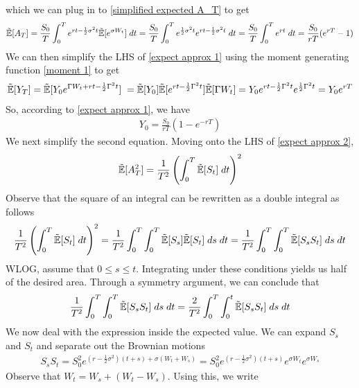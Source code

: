 \documentclass[reqno]{amsart}
\newcommand{\rE}[1]{\tilde{\E}[#1]}
\begin{document}
which we can plug in to \eqref{simplified expected A_T} to get
\begin{align} 
     \rE{A_T}
     = \frac{S_0}{T} \int_0^T e^{rt-\frac{1}{2}\sigma^2t} \rE{e^{\sigma W_t}}  \; dt
     = \frac{S_0}{T} \int_0^T e^{\frac{1}{2}\sigma^2 t} e^{rt-\frac{1}{2}\sigma^2t} \; dt
     = \frac{S_0}{T} \int_0^T e^{rt} \; dt
     = \frac{S_0}{rT} (e^{rT}-1)
\end{align}
We can then simplify the LHS of \eqref{expect approx 1} using the moment generating function \eqref{moment 1} to get
\begin{align} 
     \rE{Y_T} 
     = \rE{Y_0e^{\Gamma W_t+rt-\frac{1}{2}\Gamma^2t}} \;
     = \rE{Y_0} \rE{e^{rt - \frac{1}{2}\Gamma^2t}} \rE{\Gamma W_t}
     = Y_0 e^{rt - \frac{1}{2}\Gamma^2t} e^{\frac{1}{2}\Gamma^2 t}
     = Y_0 e^{rT}
\end{align}
So, according to \eqref{expect approx 1}, we have
\begin{align} \label{calibration 1 r neq 0}
     Y_0 = \frac{S_0}{rT}(1-e^{-rT})
\end{align}
We next simplify the second equation. Moving onto the LHS of \eqref{expect approx 2},
\begin{align}
     \rE{A_T^2}
     = {\frac{1}{T^2} \left(\int_0^T \rE{S_t} \; dt\right)^2}
\end{align}
Observe that the square of an integral can be rewritten as a double integral as follows
\begin{align}
     {\frac{1}{T^2} \left(\int_0^T \rE{S_t} \; dt\right)^2}
     = {\frac{1}{T^2} \int_0^T \int_0^T \rE{S_s} \rE{S_t} \; ds \; dt}
     = {\frac{1}{T^2} \int_0^T \int_0^T \rE{S_s S_t} \; ds \; dt}
\end{align}
WLOG, assume that $0 \leq s \leq t$. Integrating under these conditions yields us half of the desired area. Through a symmetry argument, we can conclude that
\begin{align}
     {\frac{1}{T^2} \int_0^T \int_0^T \rE{S_s S_t} \; ds \; dt}
     = {\frac{2}{T^2} \int_0^T \int_0^t \rE{S_s S_t} \; ds \; dt}
\end{align}
We now deal with the expression inside the expected value. We can expand $S_s$ and $S_t$ and separate out the Brownian motions
\begin{align}
     S_{s} S_{t} 
     = S_0^2 e^{(r-\frac{1}{2}\sigma^2)(t+s)+\sigma(W_t+W_s)}
     = S_0^2 e^{(r-\frac{1}{2}\sigma^2)(t+s)} e^{\sigma W_t} e^{\sigma W_s}
\end{align}
Observe that $W_t = W_s + (W_t - W_s)$. Using this, we write
\end{document}
